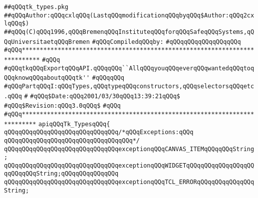 \label{src/lib/tk/src/tk_types.pkg}
\verb|##qQQqtk_types.pkg|\newline
\verb|##qQQqAuthor:qQQqcxlqQQq(LastqQQqmodificationqQQqbyqQQq$Author:qQQq2cxlqQQq$)|\newline
\verb|##qQQq(C)qQQq1996,qQQqBremenqQQqInstituteqQQqforqQQqSafeqQQqSystems,qQQqUniversitaetqQQqBremen|\newline
\newline
\verb|#qQQqCompiledqQQqby:|\newline
\verb|#qQQqqQQqqQQqqQQqqQQq|\newline
\newline
\newline
\verb|#qQQq***************************************************************************|\newline
\verb|#qQQq|\newline
\verb|#qQQqtkqQQqExportqQQqAPI.qQQqqQQq``AllqQQqyouqQQqeverqQQqwantedqQQqtoqQQqknowqQQqaboutqQQqtk''|\newline
\verb|#qQQqqQQq|\newline
\verb|#qQQqPartqQQqI:qQQqTypes,qQQqtypeqQQqconstructors,qQQqselectorsqQQqetc.qQQq|\newline
\verb|#|\newline
\verb|#qQQq$Date:qQQq2001/03/30qQQq13:39:21qQQq$|\newline
\verb|#qQQq$Revision:qQQq3.0qQQq$|\newline
\verb|#qQQq|\newline
\verb|#qQQq**************************************************************************|\newline
\newline
\newline
\newline
\verb|apiqQQqTk_TypesqQQq{|\newline
\newline
\verb|qQQqqQQqqQQqqQQqqQQqqQQqqQQqqQQq/*qQQqExceptions:qQQq|\newline
\verb|qQQqqQQqqQQqqQQqqQQqqQQqqQQqqQQqqQQq*/|\newline
\verb|qQQqqQQqqQQqqQQqqQQqqQQqqQQqqQQqexceptionqQQqCANVAS_ITEMqQQqqQQqString;|\newline
\verb|qQQqqQQqqQQqqQQqqQQqqQQqqQQqqQQqexceptionqQQqWIDGETqQQqqQQqqQQqqQQqqQQqqQQqqQQqString;qQQqqQQqqQQqqQQq|\newline
\verb|qQQqqQQqqQQqqQQqqQQqqQQqqQQqqQQqexceptionqQQqTCL_ERRORqQQqqQQqqQQqqQQqString;|\newline
